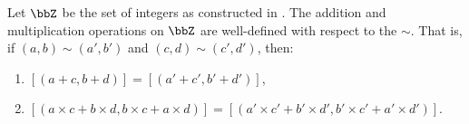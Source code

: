 \begin{proposition} \label{proposition:integer_operations_well_defined}
Let $\bbZ$ be the set of integers as constructed in . The addition and multiplication operations on $\bbZ$ are well-defined with respect to the  $\sim$. That is, if $(a, b) \sim (a', b')$ and $(c, d) \sim (c', d')$, then:
\begin{enumerate}
    \item $[(a + c, b + d)] = [(a' + c', b' + d')]$,
    \item $[(a \times c + b \times d, b \times c + a \times d)] = [(a' \times c' + b' \times d', b' \times c' + a' \times d')]$.
\end{enumerate}
\end{proposition}

